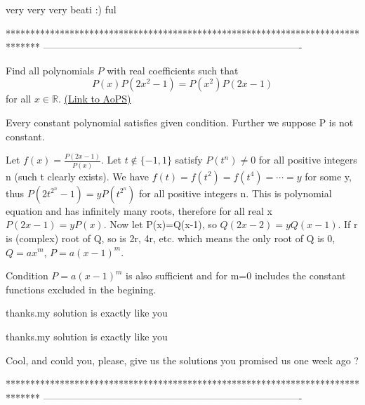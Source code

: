 \begin{solution}
	very very very beati :) ful
\end{solution}
*******************************************************************************
-------------------------------------------------------------------------------

\begin{problem}
	Find all polynomials $P$ with real coefficients such that \[ P(x)P(2x^2-1)=P(x^2)P(2x-1)\] for all $x \in \mathbb R$.
	\flushright \href{https://artofproblemsolving.com/community/c6h317528}{(Link to AoPS)}
\end{problem}



\begin{solution}
	Every constant polynomial satisfies given condition. Further we suppose P is not constant.

Let $ f(x) = \frac {P(2x - 1)}{P(x)}$. Let $ t\not\in\{ - 1,1\}$ satisfy $ P(t^n)\neq 0$ for all positive integers n (such t clearly exists). We have $ f(t) = f(t^2) = f(t^4) = \cdots = y$ for some y, thus $ P(2t^{2^n} - 1) = yP(t^{2^n})$ for all positive integers n. This is polynomial equation and has infinitely many roots, therefore for all real x
$ P(2x - 1) = yP(x)$. Now let P(x)=Q(x-1), so 
$ Q(2x - 2) = yQ(x - 1)$.
If r is (complex) root of Q, so is 2r, 4r, etc. which means the only root of Q is 0, $ Q = ax^m$, $ P = a(x - 1)^m$.

Condition $ P = a(x - 1)^m$ is also sufficient and for m=0 includes the constant functions excluded in the begining.
\end{solution}



\begin{solution}
	thanks.my solution is exactly like you
\end{solution}



\begin{solution}
	\begin{tcolorbox}thanks.my solution is exactly like you\end{tcolorbox}

Cool, and could you, please, give us the solutions you promised us one week ago ?
\end{solution}
*******************************************************************************
-------------------------------------------------------------------------------

